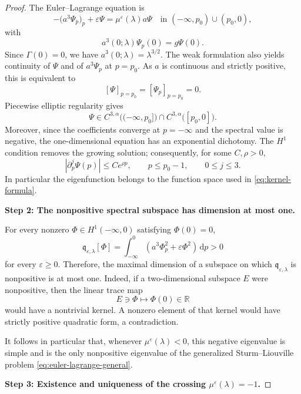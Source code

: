 \documentclass[10pt,a4paper]{amsart}
\newcommand{\R}{\mathbb{R}}
\newcommand{\dd}{\,\mathrm{d}}
\begin{document}
\begin{proof}
The Euler--Lagrange equation is
\begin{equation}
\label{eq:euler-lagrange-general}
-\bigl(a^3\Psi_p\bigr)_p+\varepsilon\Psi
=
\mu^\varepsilon(\lambda)a\Psi
\quad\text{in }(-\infty,p_0)\cup(p_0,0),
\end{equation}
with
\[
a^3(0;\lambda)\Psi_p(0)=g\Psi(0).
\]
Since $\Gamma(0)=0$, we have $a^3(0;\lambda)=\lambda^{3/2}$.
The weak formulation also yields continuity of $\Psi$ and of
$a^3\Psi_p$ at $p=p_0$.  As $a$ is continuous and strictly positive,
this is equivalent to
\[
[\Psi]_{p=p_0}=[\Psi_p]_{p=p_0}=0.
\]
Piecewise elliptic regularity gives
\[
\Psi\in
C^{3,\alpha}\bigl((-\infty,p_0]\bigr)
\cap
C^{3,\alpha}\bigl([p_0,0]\bigr).
\]
Moreover, since the coefficients converge at $p=-\infty$ and the
spectral value is negative, the one-dimensional equation has an
exponential dichotomy.  The $H^1$ condition removes the growing
solution; consequently, for some $C,\rho>0$,
\[
 |\partial_p^j\Psi(p)|\leq Ce^{\rho p},
 \qquad p\leq p_0-1,\qquad 0\leq j\leq3.
\]
In particular the eigenfunction belongs to the function space used in
\eqref{eq:kernel-formula}.

\medskip
\noindent
\textbf{Step 2: The nonpositive spectral subspace has dimension at most one.}

For every nonzero $\Phi\in H^1(-\infty,0)$ satisfying $\Phi(0)=0$,
\[
\mathfrak q_{\varepsilon,\lambda}[\Phi]
=
\int_{-\infty}^{0}
\left(
a^3\Phi_p^2+\varepsilon\Phi^2
\right)\dd p>0
\]
for every $\varepsilon\geq0$.  Therefore, the maximal dimension of a subspace on
which $\mathfrak q_{\varepsilon,\lambda}$ is nonpositive is at most one.
Indeed, if a two-dimensional subspace $E$ were nonpositive, then the
linear trace map
\[
E\ni\Phi\longmapsto\Phi(0)\in\R
\]
would have a nontrivial kernel.  A nonzero element of that kernel
would have strictly positive quadratic form, a contradiction.

It follows in particular that, whenever
$\mu^\varepsilon(\lambda)<0$, this negative eigenvalue is simple and is the
only nonpositive eigenvalue of the generalized Sturm--Liouville
problem \eqref{eq:euler-lagrange-general}.

\medskip
\noindent
\textbf{Step 3: Existence and uniqueness of the crossing
$\mu^\varepsilon(\lambda)=-1$.}


\end{proof}
\end{document}
